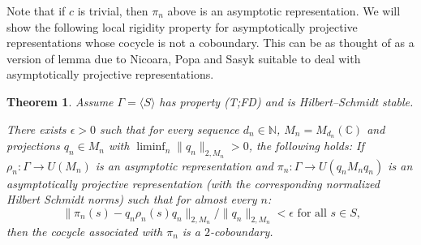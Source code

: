 \documentclass[11pt]{amsart}
\newcommand{\N}{{\mathbb{N}}}
\newcommand{\C}{{\mathbb{C}}}
\newtheorem{theorem}{Theorem}[section]
\theoremstyle{definition}
\theoremstyle{remark}
\theoremstyle{definition}
\begin{document}
Note that if $c$ is trivial, then $\pi_n$ above is an asymptotic representation.
We will show the following local rigidity property for asymptotically projective representations whose cocycle is not a coboundary.
This can be as thought of as a version of lemma due to Nicoara, Popa and Sasyk \cite[Lemma 1.1]{zbMATH05116360} suitable to deal with asymptotically projective representations.
    
\begin{theorem}
\label{thm:NPS_analog}
Assume $\Gamma = \langle S \rangle$ has property (T;FD) and is Hilbert--Schmidt stable.

There exists $\epsilon> 0$ such that for every sequence $d_n \in \N$, $M_n = M_{d_n}(\C)$ and projections $q_n \in M_n$ with $\liminf_n \| q_n\|_{2,M_n} > 0$, the following holds: If  $\rho_n: \Gamma \to U( M_n )$ is an asymptotic representation and $\pi_n:\Gamma\rightarrow U(q_n M_n q_n)$ is an asymptotically projective representation  (with the corresponding normalized Hilbert Schmidt norms) such that for almost every $n$:
$$\| \pi_n(s) - q_n\rho_n(s) q_n\|_{2,M_n} / \|q_n \|_{2,M_n}< \epsilon \text{ for all $s \in S$,}$$
then the cocycle associated with $\pi_n$ is a $2$-coboundary.
\end{theorem}
\end{document}
